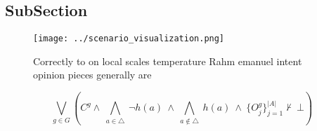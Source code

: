 \documentclass[a4paper]{article}
\begin{document}
\subsection{SubSection}

\begin{figure}
\centering
\texttt{[image: ../scenario\_visualization.png]}
\caption{Correctly to on local scales temperature Rahm emanuel intent opinion pieces generally are
}
\end{figure}
 
\[\bigvee_{g\in G} (C^g \wedge\ \bigwedge_{a\in \triangle}\ \neg h(a)\ \wedge\ \bigwedge_{a\notin \triangle}\ h(a)\ \wedge\ \{O_j^g\}_{j=1}^{|A|} \nvdash\ \bot )\]
\end{document}
